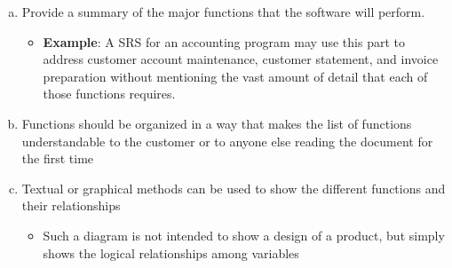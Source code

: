 \documentclass[]{article}
\begin{document}
\begin{enumerate}[a)]

  \item Provide a summary of the major functions that the software will perform. 
  \begin{itemize}
    \item \textbf{Example}: A SRS for an accounting program may use this part to address customer account maintenance, customer statement, and invoice preparation without mentioning the vast amount of detail that each of those functions requires.
  \end{itemize}
  \item Functions should be organized in a way that makes the list of functions understandable to the customer or to anyone else reading the document for the first time
  \item Textual or graphical methods can be used to show the different functions and their relationships
  \begin{itemize}
    \item Such a diagram is not intended to show a design of a product, but simply shows the logical relationships among variables
  \end{itemize} 
\end{enumerate}
\end{document}

